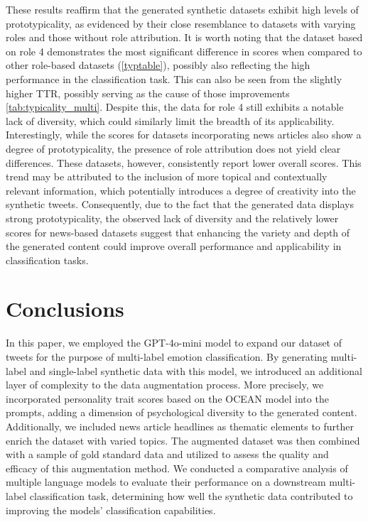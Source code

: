 \documentclass[manuscript]{clv3}
\begin{document}
These results reaffirm that the generated synthetic datasets exhibit high levels of prototypicality, as evidenced by their close resemblance to datasets with varying roles and those without role attribution. It is worth noting that the dataset based on role 4 demonstrates the most significant difference in scores when compared to other role-based datasets (\autoref{typtable}), possibly also reflecting the high performance in the classification task. This can also be seen from the slightly higher TTR, possibly serving as the cause of those improvements \autoref{tab:typicality_multi}. Despite this, the data for role 4 still exhibits a notable lack of diversity, which could similarly limit the breadth of its applicability. Interestingly, while the scores for datasets incorporating news articles also show a degree of prototypicality, the presence of role attribution does not yield clear differences. These datasets, however, consistently report lower overall scores. This trend may be attributed to the inclusion of more topical and contextually relevant information, which potentially introduces a degree of creativity into the synthetic tweets. Consequently, due to the fact that the generated data displays strong prototypicality, the observed lack of diversity and the relatively lower scores for news-based datasets suggest that enhancing the variety and depth of the generated content could improve overall performance and applicability in classification tasks.

\section{Conclusions}
In this paper, we employed the GPT-4o-mini model to expand our dataset of tweets for the purpose of multi-label emotion classification. By generating multi-label and single-label synthetic data with this model, we introduced an additional layer of complexity to the data augmentation process. More precisely, we incorporated personality trait scores based on the OCEAN model into the prompts, adding a dimension of psychological diversity to the generated content. Additionally, we included news article headlines as thematic elements to further enrich the dataset with varied topics. The augmented dataset was then combined with a sample of gold standard data and utilized to assess the quality and efficacy of this augmentation method. We conducted a comparative analysis of multiple language models to evaluate their performance on a downstream multi-label classification task, determining how well the synthetic data contributed to improving the models' classification capabilities.
\end{document}
